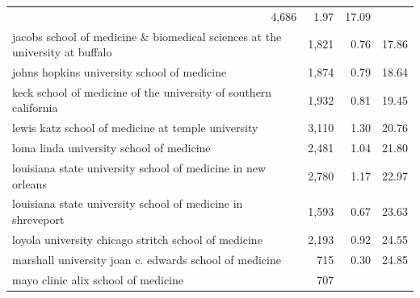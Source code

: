 \begin{table}[!h]
\begin{tabular}{llll}
  \multicolumn{1}{r}{4,686} &
  \multicolumn{1}{r}{1.97} &
  \multicolumn{1}{r}{17.09} \\
\multicolumn{1}{l}{\hspace{1em}jacobs school of medicine \& biomedical sciences at the university at buffalo} &
  \multicolumn{1}{r}{1,821} &
  \multicolumn{1}{r}{0.76} &
  \multicolumn{1}{r}{17.86} \\
\multicolumn{1}{l}{\hspace{1em}johns hopkins university school of medicine} &
  \multicolumn{1}{r}{1,874} &
  \multicolumn{1}{r}{0.79} &
  \multicolumn{1}{r}{18.64} \\
\multicolumn{1}{l}{\hspace{1em}keck school of medicine of the university of southern california} &
  \multicolumn{1}{r}{1,932} &
  \multicolumn{1}{r}{0.81} &
  \multicolumn{1}{r}{19.45} \\
\multicolumn{1}{l}{\hspace{1em}lewis katz school of medicine at temple university} &
  \multicolumn{1}{r}{3,110} &
  \multicolumn{1}{r}{1.30} &
  \multicolumn{1}{r}{20.76} \\
\multicolumn{1}{l}{\hspace{1em}loma linda university school of medicine} &
  \multicolumn{1}{r}{2,481} &
  \multicolumn{1}{r}{1.04} &
  \multicolumn{1}{r}{21.80} \\
\multicolumn{1}{l}{\hspace{1em}louisiana state university school of medicine in new orleans} &
  \multicolumn{1}{r}{2,780} &
  \multicolumn{1}{r}{1.17} &
  \multicolumn{1}{r}{22.97} \\
\multicolumn{1}{l}{\hspace{1em}louisiana state university school of medicine in shreveport} &
  \multicolumn{1}{r}{1,593} &
  \multicolumn{1}{r}{0.67} &
  \multicolumn{1}{r}{23.63} \\
\multicolumn{1}{l}{\hspace{1em}loyola university chicago stritch school of medicine} &
  \multicolumn{1}{r}{2,193} &
  \multicolumn{1}{r}{0.92} &
  \multicolumn{1}{r}{24.55} \\
\multicolumn{1}{l}{\hspace{1em}marshall university joan c. edwards school of medicine} &
  \multicolumn{1}{r}{715} &
  \multicolumn{1}{r}{0.30} &
  \multicolumn{1}{r}{24.85} \\
\multicolumn{1}{l}{\hspace{1em}mayo clinic alix school of medicine} &
  \multicolumn{1}{r}{707} &

\end{tabular}
\end{table}
